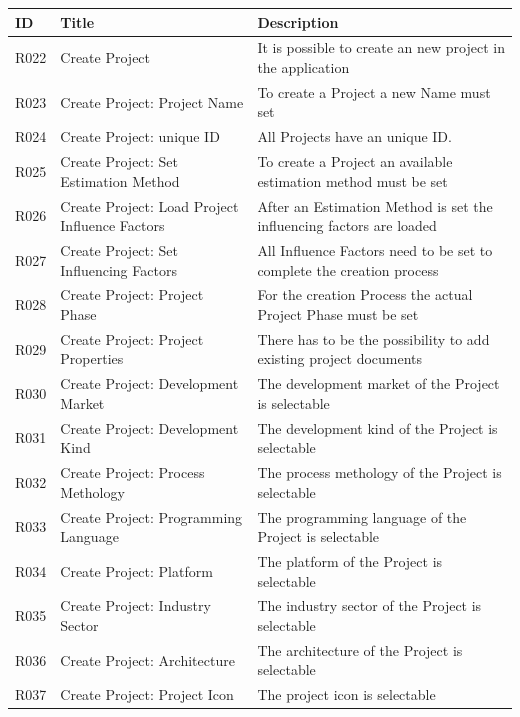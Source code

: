 \begin{table}[h]
	\centering 
	\setlength{\tabcolsep}{4pt}
	\begin{tabular}{|l||p{5cm}|p{9cm}|}\hline
		ID		& Title&Description\\ \hline\hline
		R022  	& Create Project&It is possible to create an new project in the application\\ \hline
		R023  	& Create Project: Project Name
		&To create a Project a new Name must set
		\\ \hline
		R024 	& Create Project: unique ID
		&All Projects have an unique ID.
		\\ \hline
		R025  	& Create Project: Set Estimation Method
		&To create a Project an available estimation method must be set
		\\ \hline
		R026  	& Create Project: Load Project Influence Factors
		&After an Estimation Method is set the influencing factors are loaded
		\\ \hline
		R027  	& Create Project: Set Influencing Factors
		&All Influence Factors need to be set to complete the creation process
		\\ \hline
		R028  	& Create Project: Project Phase
		&For the creation Process the actual Project Phase must be set
		\\ \hline
		R029  	& Create Project: Project Properties
		&There has to be the possibility to add existing project documents
		\\ \hline
		R030  	& Create Project: Development Market
		&The development market of the Project is selectable 
		\\ \hline
		R031  	& Create Project: Development Kind
		&The development kind of the Project is selectable 
		\\ \hline
		R032  	& Create Project: Process Methology
		&The process methology of the Project is selectable 
		\\ \hline
		R033  	& Create Project: Programming Language
		&The programming language of the Project is selectable 
		\\ \hline
		R034  	& Create Project: Platform
		&The platform of the Project is selectable 
		\\ \hline
		R035  	& Create Project: Industry Sector
		&The industry sector of the Project is selectable 
		\\ \hline
		R036  	& Create Project: Architecture
		&The architecture of the Project is selectable 
		\\ \hline
		R037  	& Create Project: Project Icon
		&The project icon is selectable 

\end{tabular}
\end{table}
